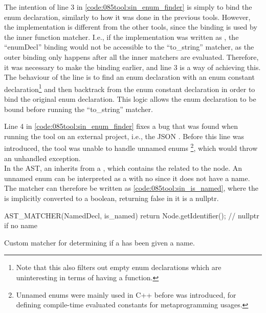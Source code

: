 The intention of line 3 in \cref{code:085tool:sin_enum_finder} is simply to bind the enum declaration, similarly to how it was done in the previous tools.
However, the implementation is different from the other tools, since the binding is used by the inner  function matcher.
I.e., if the implementation was written as , the ``enumDecl'' binding would not be accessible to the ``to\_string'' matcher, as the outer binding only happens after all the inner matchers are evaluated.
Therefore, it was necessary to make the binding earlier, and line 3 is a way of achieving this.\\
The behaviour of the line is to find an enum declaration with an enum constant declaration\footnote{
    Note that this also filters out empty enum declarations which are uninteresting in terms of having a  function.
} and then backtrack from the enum constant declaration in order to bind the original enum declaration. This logic allows the enum declaration to be bound before running the ``to\_string'' matcher.

Line 4 in \cref{code:085tool:sin_enum_finder} fixes a bug that was found when running the tool on an external project, i.e., the JSON \cite{Lohmann22}.
Before this line was introduced, the tool was unable to handle unnamed enums
\footnote{
    Unnamed enums were mainly used in C++ before  was introduced, for defining compile-time evaluated constants for metaprogramming usages.
}, which would throw an unhandled exception.\\
In the AST, an  inherits from a , which contains the  related to the node.
An unnamed enum can be interpreted as a  with no  since it does not have a name.
The matcher can therefore be written as \cref{code:085tool:sin_is_named}, where the  is implicitly converted to a boolean, returning false in it is a nullptr.

\begin{listing}[H]
    \begin{cppcode}
AST_MATCHER(NamedDecl, is_named) {
	return Node.getIdentifier(); // nullptr if no name
}
    \end{cppcode}
    \caption{Custom matcher for determining if a  has been given a name.}
    \label{code:085tool:sin_is_named}
\end{listing}

